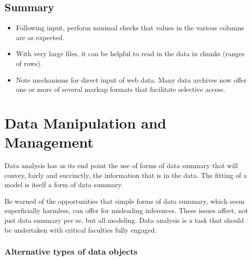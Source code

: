 \documentclass{tufte-book}\usepackage[]{graphicx}\usepackage[]{color}
\begin{document}
\section{Summary}
\begin{itemize}

\item[] Following input, perform minimal checks that
  values in the various columns are as expected.

\item[] With very large files, it can be helpful to read in the
  data in chunks (ranges of rows).

\item[] Note mechanisms for direct input of web data.  Many data
  archives now offer one or more of several markup formats that
  facilitate selective access.
\end{itemize}
% 
\cleartooddpage

\chapter{Data Manipulation and Management}\label{ch:manip}





Data analysis has as its end point the use of forms of data summary
that will convey, fairly and succinctly, the information that is in
the data.  The fitting of a model is itself a form of data summary.

Be warned of
the opportunities that simple forms of data summary, which seem
superficially harmless, can offer for misleading inferences.  These
issues affect, not just data summary per se, but all modeling.  Data
analysis is a task that should be undertaken with critical
faculties fully engaged.

\subsection*{Alternative types of data objects}
\end{document}
